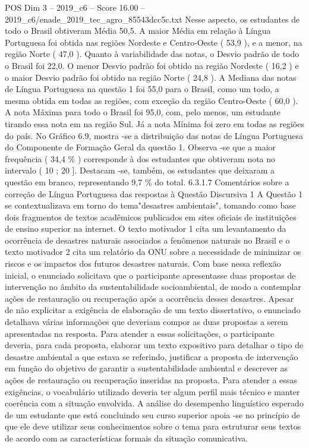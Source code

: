 \begin{textsample}{POS Dim 3 – 2019\_c6 – Score 16.00 – 2019\_c6/enade\_2019\_tec\_agro\_85543dcc5c.txt}
Nesse aspecto, os estudantes de todo o Brasil obtiveram Média 50,5.
A maior Média em relação à Língua Portuguesa foi obtida nas regiões Nordeste e Centro-Oeste ( 53,9 ), e a menor, na região Norte ( 47,0 ).
Quanto à variabilidade das notas, o Desvio padrão de todo o Brasil foi 22,0.
O menor Desvio padrão foi obtido na região Nordeste ( 16,2 ) e o maior Desvio padrão foi obtido na região Norte ( 24,8 ).
A Mediana das notas de Língua Portuguesa na questão 1 foi 55,0 para o Brasil, como um todo, a mesma obtida em todas as regiões, com exceção da região Centro-Oeste ( 60,0 ).
A nota Máxima para todo o Brasil foi 95,0, com, pelo menos, um estudante tirando essa nota em na região Sul.
Já a nota Mínima foi zero em todas as regiões do país.
No Gráfico 6.9, mostra -se a distribuição das notas de Língua Portuguesa do Componente de Formação Geral da questão 1.
Observa -se que a maior frequência ( 34,4 \% ) corresponde à dos estudantes que obtiveram nota no intervalo ( 10 ; 20 ].
Destacam -se, também, os estudantes que deixaram a questão em branco, representando 9,7 \% do total. 6.3.1.7 Comentários sobre a correção de Língua Portuguesa das respostas à Questão Discursiva 1 A Questão 1 se contextualizava em torno do tema"desastres ambientais", tomando como base dois fragmentos de textos acadêmicos publicados em sites oficiais de instituições de ensino superior na internet.
O texto motivador 1 cita um levantamento da ocorrência de desastres naturais associados a fenômenos naturais no Brasil e o texto motivador 2 cita um relatório da ONU sobre a necessidade de minimizar os riscos e os impactos dos futuros desastres naturais.
Com base nessa reflexão inicial, o enunciado solicitava que o participante apresentasse duas propostas de intervenção no âmbito da sustentabilidade socioambiental, de modo a contemplar ações de restauração ou recuperação após a ocorrência desses desastres.
Apesar de não explicitar a exigência de elaboração de um texto dissertativo, o enunciado detalhava várias informações que deveriam compor as duas propostas a serem apresentadas na resposta.
Para atender a essas solicitações, o participante deveria, para cada proposta, elaborar um texto expositivo para detalhar o tipo de desastre ambiental a que estava se referindo, justificar a proposta de intervenção em função do objetivo de garantir a sustentabilidade ambiental e descrever as ações de restauração ou recuperação inseridas na proposta.
Para atender a essas exigências, o vocabulário utilizado deveria ter algum perfil mais técnico e manter coerência com a situação envolvida.
A análise do desempenho linguístico esperado de um estudante que está concluindo seu curso superior apoia -se no princípio de que ele deve utilizar seus conhecimentos sobre o tema para estruturar seus textos de acordo com as características formais da situação comunicativa.

\end{textsample}
